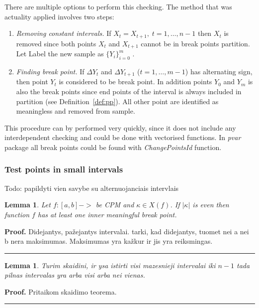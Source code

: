 \documentclass[12pt, a4paper]{article}
\newtheorem{lemma}[theorem]{Lemma}
\newenvironment{proof}[1][Proof]{\noindent \textbf{#1.} }{\  \rule{0.5em}{0.5em}}
\numberwithin{equation}{section}
\begin{document}
There are multiple options to perform this checking. The method
that was actuality applied involves two steps:

\begin{enumerate}
  \item \emph{Removing constant intervals.} 
  If  $X_{t}=X_{t+1},\;t=1,\dots,n-1$ then $X_t$ is removed
  since both points $X_{t}$ and $X_{t+1}$ cannot be in break points
  partition. Let Label the new sample as  $\{Y_{i}\}_{i=0}^{m}$ .
  
  \item \emph{Finding break point.}  
  If $\Delta Y_{t}$ and $\Delta Y_{t+1}$ ($t=1,\dots,m-1$)
  has alternating sign, then point $Y_t$ is considered 
  to be break point. In addition points $Y_0$ and $Y_m$ 
  is also the break points since end points of 
  the interval is always included in partition (see
  Definition~\ref{def:pp}). All other point are identified as
  meaningless and removed from sample.  

\end{enumerate}


This procedure can by performed very quickly, since it does not include
any interdependent checking and could be done with vectorised functions.
In \emph{pvar} package all break points could be found with \emph{ChangePointsId} function.



\subsubsection{Test points in small intervals}
Todo: papildyti vien savybe su alternuojanciais intervlais

\begin{lemma}\label{lm:evenkapa}
Let $f:[a,b] -> $ be CPM and $\kappa \in X(f)$. If $|\kappa|$ is even
then function $f$ has at least one inner meaningful break point.
\end{lemma}
\begin{proof}
Didejantys, pažejantys intervalai.
tarki, kad didejantys, tuomet nei a nei b nera maksimumas.
Maksimumas yra kažkur ir jis yra reiksmingas.
\end{proof}



\begin{lemma}\label{lm:samllincrease}
Turim skaidini, ir ysa istirti visi mazesnieji intervalai iki $n-1$
tada pilnas intervalas yra arba visi arba nei vienas.

\end{lemma}
\begin{proof}
Pritaikom skaidimo teorema.
\end{proof}
\end{document}

